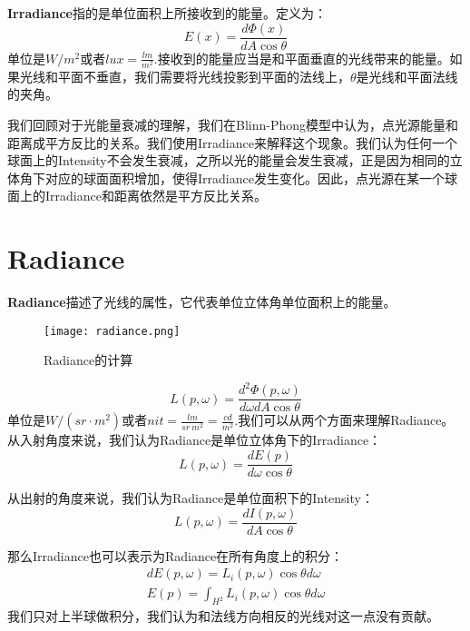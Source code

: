 \documentclass[openany]{progbookcn}
\begin{document}
\textbf{Irradiance}指的是单位面积上所接收到的能量。定义为：
\begin{equation}
	E(x)=\frac{d\Phi(x)}{dA\cos\theta}
\end{equation} 单位是$W/m^2$或者$lux=\frac{lm}{m^2}$.接收到的能量应当是和平面垂直的光线带来的能量。如果光线和平面不垂直，我们需要将光线投影到平面的法线上，$\theta$是光线和平面法线的夹角。

我们回顾对于光能量衰减的理解，我们在Blinn-Phong模型中认为，点光源能量和距离成平方反比的关系。我们使用Irradiance来解释这个现象。我们认为任何一个球面上的Intensity不会发生衰减，之所以光的能量会发生衰减，正是因为相同的立体角下对应的球面面积增加，使得Irradiance发生变化。因此，点光源在某一个球面上的Irradiance和距离依然是平方反比关系。

\section{Radiance}
\textbf{Radiance}描述了光线的属性，它代表单位立体角单位面积上的能量。
\begin{figure}[H]
	\centering
	\texttt{[image: radiance.png]}
	\caption{Radiance的计算}
	\label{fig:radiance}
\end{figure}

\begin{equation}
	L(p,\omega)=\frac{d^2\Phi(p,\omega)}{d\omega dA\cos\theta}
\end{equation} 单位是$W/(sr\cdot m^2)$或者$nit=\frac{lm}{sr\ m^2}=\frac{cd}{m^2}$.我们可以从两个方面来理解Radiance。从入射角度来说，我们认为Radiance是单位立体角下的Irradiance：
\begin{equation}
	L(p,\omega)=\frac{dE(p)}{d\omega \cos\theta}
\end{equation}

从出射的角度来说，我们认为Radiance是单位面积下的Intensity：
\begin{equation}
		L(p,\omega)=\frac{dI(p,\omega)}{dA \cos\theta}
\end{equation}

那么Irradiance也可以表示为Radiance在所有角度上的积分：
\begin{equation}
	\begin{split}
		dE(p,\omega)=L_i(p,\omega)\cos\theta d\omega\\
		E(p)=\int_{H^2}L_i(p,\omega)\cos\theta d\omega
	\end{split}
\end{equation}我们只对上半球做积分，我们认为和法线方向相反的光线对这一点没有贡献。
\end{document}
